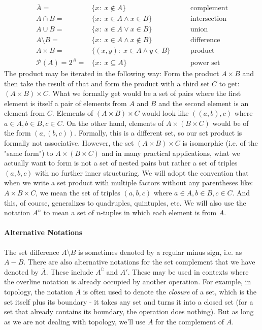 \begin{eqnarray}
 \overline{A}  =& \{x: \; x \notin A \}                    \qquad &\text{complement} \\	
 A \cap B      =& \{x: \; x \in A \wedge x \in    B \}     \qquad &\text{intersection} \\
 A \cup B      =& \{x: \; x \in A \vee   x \in    B \}     \qquad &\text{union} \\
 A \setminus B =& \{x: \; x \in A \wedge x \notin B \}     \qquad &\text{difference} \\
 A \times B    =& \{(x,y): \; x \in A \wedge y \in    B \} \qquad &\text{product} \\
 \mathcal{P}(A) 
        = 2^A = &  \{x : \; x \subseteq A \}               \qquad &\text{power set}
\end{eqnarray}
The product may be iterated in the following way: Form the product $A \times B$ and then take the result of that and form the product with a third set $C$ to get: $(A \times B) \times C$. What we formally get would be a set of pairs where the first element is itself a pair of elements from $A$ and $B$ and the second element is an element from $C$. Elements of $(A \times B) \times C$ would look like $((a,b),c)$ where $a \in A, b \in B, c \in C$. On the other hand, elements of $A \times (B \times C)$ would be of the form $(a, (b,c))$. Formally, this is a different set, so our set product is formally not associative. However, the set $(A \times B) \times C$ is isomorphic (i.e. of the "same form") to $A \times (B \times C)$ and in many practical applications, what we actually want to form is not a set of nested pairs but rather a set of triples $(a,b,c)$ with no further inner structuring. We will adopt the convention that when we write a set product with multiple factors without any parentheses like: $A \times B \times C$, we mean the set of triples $(a,b,c)$ where $a \in A, b \in B, c \in C$. And this, of course, generalizes to quadruples, quintuples, etc. We will also use the notation $A^n$ to mean a set of $n$-tuples in which each element is from $A$. 


\paragraph{Alternative Notations}

The set difference $A \setminus B$ is sometimes denoted by a regular minus sign, i.e. as $A - B$. There are also alternative notations for the set complement that we have denoted by $\overline{A}$. These include $A^\complement$ and $A'$. These may be used in contexts where the overline notation is already occupied by another operation. For example, in topology, the notation $\overline{A}$ is often used to denote the \emph{closure} of a set, which is the set itself plus its boundary - it takes any set and turns it into a closed set (for a set that already contains its boundary, the operation does nothing). But as long as we are not dealing with topology, we'll use $\overline{A}$ for the complement of $A$.

